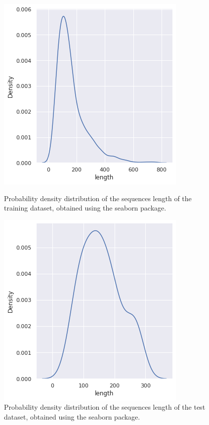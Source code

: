 \documentclass[nocrop]{bioinfo}
\begin{document}
\begin{supplementary}
\begin{figure}[!h]
    \centering
    \begin{minipage}{0.45\textwidth}
    \includegraphics[scale=0.5]{./plotsJPred4/length_training.png}
    \caption{Probability density distribution of the sequences length of the training dataset, obtained using the seaborn package.}
    \end{minipage}\hfill
    \begin{minipage}{0.45\textwidth}
    \centering
    \includegraphics[scale=0.5]{./plotsJPred4/length_blind.png}
    \caption{Probability density distribution of the sequences length of the test dataset, obtained using the seaborn package.}
    \end{minipage}
\end{figure}

\end{supplementary}
\end{document}
